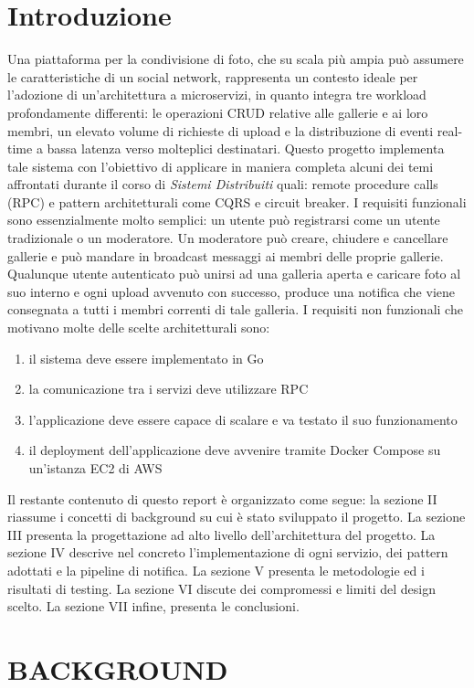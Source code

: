 \documentclass[conference]{IEEEtran}
\begin{document}
\section{Introduzione}
Una piattaforma per la condivisione di foto, che su scala più ampia può assumere le caratteristiche di un social network, rappresenta un contesto ideale per l'adozione di un'architettura a microservizi, in quanto integra tre workload profondamente differenti: le operazioni CRUD relative alle gallerie e ai loro membri, un elevato volume di richieste di upload e la distribuzione di eventi real-time a bassa latenza verso molteplici destinatari. Questo progetto implementa tale sistema con l'obiettivo di applicare in maniera completa alcuni dei temi affrontati durante il corso di \textit{Sistemi Distribuiti} quali: remote procedure calls (RPC) e pattern architetturali come CQRS e circuit breaker. I requisiti funzionali sono essenzialmente molto semplici: un utente può registrarsi come un utente tradizionale o un moderatore. Un moderatore può creare, chiudere e cancellare gallerie e può mandare in broadcast messaggi ai membri delle proprie gallerie. Qualunque utente autenticato può unirsi ad una galleria aperta e caricare foto al suo interno e ogni upload avvenuto con successo, produce una notifica che viene consegnata a tutti i membri correnti di tale galleria. I requisiti non funzionali che motivano molte delle scelte architetturali sono:
\begin{enumerate}
\item il sistema deve essere implementato in Go
\item la comunicazione tra i servizi deve utilizzare RPC
\item l'applicazione deve essere capace di scalare e va testato il suo funzionamento
\item il deployment dell'applicazione deve avvenire tramite Docker Compose su un'istanza EC2 di AWS
\end{enumerate}
Il restante contenuto di questo report è organizzato come segue: la sezione II riassume i concetti di background su cui è stato sviluppato il progetto. La sezione III presenta la progettazione ad alto livello dell'architettura del progetto. La sezione IV descrive nel concreto l'implementazione di ogni servizio, dei pattern adottati e la pipeline di notifica. La sezione V presenta le metodologie ed i risultati di testing. La sezione VI discute dei compromessi e limiti del design scelto. La sezione VII infine, presenta le conclusioni.
\section{BACKGROUND}
\end{document}
